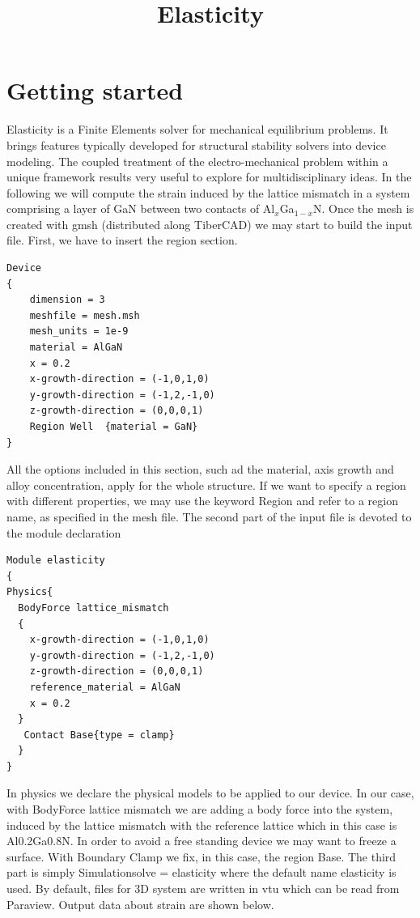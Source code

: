 \documentclass[11pt]{article} %
\title{Elasticity}
\begin{document}
\maketitle

\section{Getting started}

Elasticity is a Finite Elements solver for mechanical equilibrium problems. It brings features typically developed for structural stability solvers into device modeling. The coupled treatment of the electro-mechanical problem within a unique framework results very useful to explore for multidisciplinary ideas.
In the following we will compute the strain induced by the lattice mismatch in a system comprising a layer of GaN between two contacts of Al$_x$Ga$_{1-x}$N. Once the mesh is created with gmsh (distributed along TiberCAD) we may start to build the input file. First, we have to insert the region section. 
\begin{verbatim}
Device
{
    dimension = 3 
    meshfile = mesh.msh
    mesh_units = 1e-9
    material = AlGaN
    x = 0.2
    x-growth-direction = (-1,0,1,0) 
    y-growth-direction = (-1,2,-1,0) 
    z-growth-direction = (0,0,0,1)
    Region Well  {material = GaN}
}
\end{verbatim}
All the options included in this section, such ad the material, axis growth and alloy concentration, apply for the whole structure.  If we want to specify a region with different properties, we may use the keyword Region and refer to a region name, as specified in the mesh file. The second part of the input file is devoted to the module declaration

\begin{verbatim}
Module elasticity 
{
Physics{
  BodyForce lattice_mismatch
  {
    x-growth-direction = (-1,0,1,0) 
    y-growth-direction = (-1,2,-1,0) 
    z-growth-direction = (0,0,0,1)
    reference_material = AlGaN
    x = 0.2 
  }
   Contact Base{type = clamp}
  }
}
\end{verbatim}
In physics we declare the physical models to be applied to our device. In our case, with BodyForce lattice mismatch we are adding a body force into the system, induced by the lattice mismatch with the reference lattice which in this case is Al0.2Ga0.8N. In order to avoid a free standing device we may want to freeze a surface. With Boundary Clamp we fix, in this case, the region Base.
The third part is simply Simulation{solve = elasticity} where the default name elasticity is used. By default, files for 3D system are written in vtu which can be read from Paraview. Output data about strain are shown below.
\end{document}
